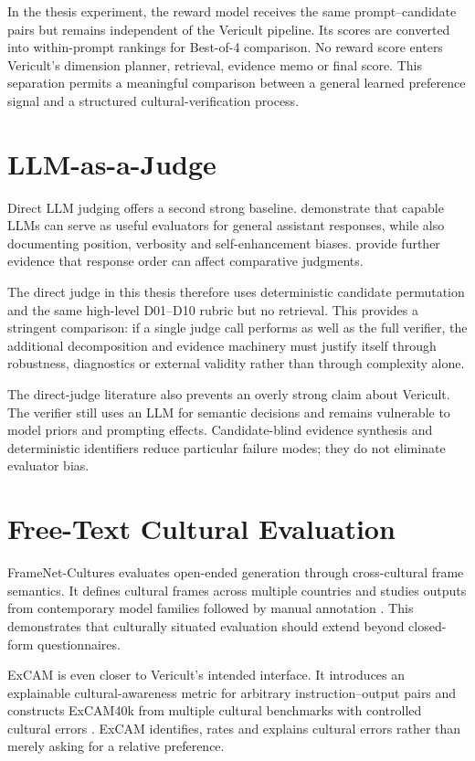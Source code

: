 In the thesis experiment, the reward model receives the same prompt--candidate pairs but remains independent of the Vericult pipeline. Its scores are converted into within-prompt rankings for Best-of-4 comparison. No reward score enters Vericult's dimension planner, retrieval, evidence memo or final score. This separation permits a meaningful comparison between a general learned preference signal and a structured cultural-verification process.

\section{LLM-as-a-Judge}

Direct LLM judging offers a second strong baseline. \textcite{zheng2023llmjudge} demonstrate that capable LLMs can serve as useful evaluators for general assistant responses, while also documenting position, verbosity and self-enhancement biases. \textcite{wang2024notfairevaluators} provide further evidence that response order can affect comparative judgments.

The direct judge in this thesis therefore uses deterministic candidate permutation and the same high-level D01--D10 rubric but no retrieval. This provides a stringent comparison: if a single judge call performs as well as the full verifier, the additional decomposition and evidence machinery must justify itself through robustness, diagnostics or external validity rather than through complexity alone.

The direct-judge literature also prevents an overly strong claim about Vericult. The verifier still uses an LLM for semantic decisions and remains vulnerable to model priors and prompting effects. Candidate-blind evidence synthesis and deterministic identifiers reduce particular failure modes; they do not eliminate evaluator bias.

\section{Free-Text Cultural Evaluation}

FrameNet-Cultures evaluates open-ended generation through cross-cultural frame semantics. It defines cultural frames across multiple countries and studies outputs from contemporary model families followed by manual annotation \parencite{jamshidi2026framenet}. This demonstrates that culturally situated evaluation should extend beyond closed-form questionnaires.

ExCAM is even closer to Vericult's intended interface. It introduces an explainable cultural-awareness metric for arbitrary instruction--output pairs and constructs ExCAM40k from multiple cultural benchmarks with controlled cultural errors \parencite{leiter2026excam}. ExCAM identifies, rates and explains cultural errors rather than merely asking for a relative preference.

